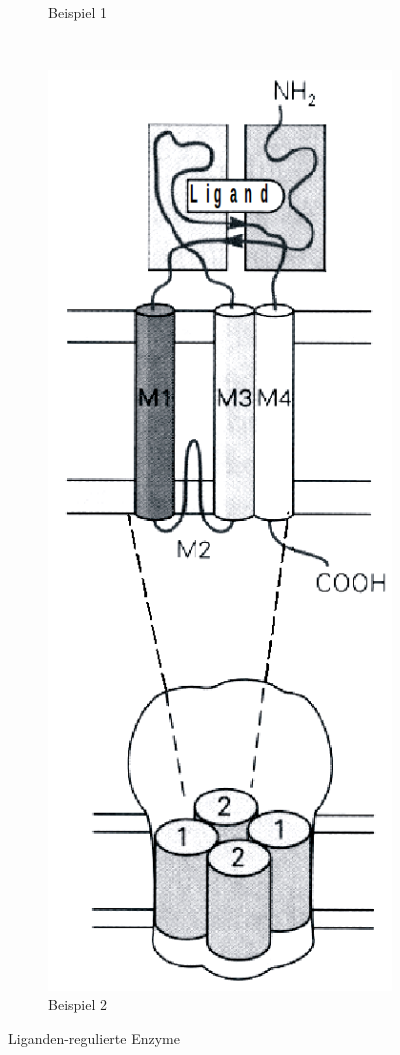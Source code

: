 \documentclass[10pt,a4paper]{report}
\begin{document}
\begin{figure}
\begin{subfigure}[b]{0.2\textwidth}
        \caption{Beispiel 1}
        \label{fig:ligand1}
    \end{subfigure}
    ~ %
    \begin{subfigure}[b]{0.2\textwidth}
        \includegraphics[width=\textwidth]{Bilder/ligand1.png}
        \caption{Beispiel 2}
        \label{fig:ligand2}
    \end{subfigure}
    \caption{Liganden-regulierte Enzyme}
    \label{fig:liganden_enzyme}
\end{figure}
\end{document}
